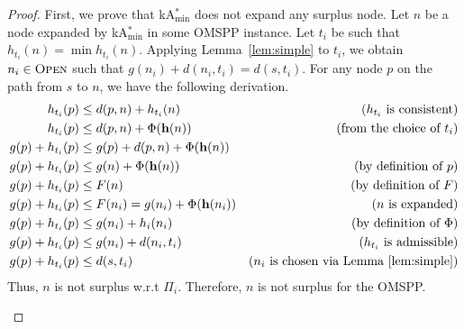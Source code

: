 \documentclass[smallextended]{svjour3}       %
\newcommand{\omspp}{\ac{OMSPP}\xspace}
\newcommand{\kastarvar}[1]{\textup{kA}$^*_{#1}$\xspace}
\newcommand{\kastarmin}{\kastarvar{\min}}
\newcommand{\open}{\textsc{Open}\xspace}
\newcommand{\vect}[1]{\mathbf{#1}}
\begin{document}
\admissiblesurplus*
\begin{proof}
First, we prove that \kastarmin does not expand any surplus node.
Let $n$ be a node expanded by \kastarmin in some \omspp instance.
Let $t_i$ be such that $h_{t_i}(n) = \min h_{t_i}(n)$.
Applying Lemma~\ref{lem:simple} to $t_i$, we obtain $n_i \in \open$ such that $g(n_i) + d(n_i, t_i) = d(s, t_i)$.
For any node $p$ on the path from $s$ to $n$, we have the following derivation.
\begin{align}
h_{t_i}(p)        & \leq d(p, n) + h_{t_i}(n)         & \text{($h_{t_i}$ is consistent)}\\
h_{t_i}(p)        & \leq d(p, n) + \Phi(\vect{h}(n))         & \text{(from the choice of $t_i$)}\\
g(p) + h_{t_i}(p) & \leq g(p) + d(p, n) + \Phi(\vect{h}(n)) & \text{}\\
g(p) + h_{t_i}(p) & \leq g(n) + \Phi(\vect{h}(n))          & \text{(by definition of $p$)}\\
g(p) + h_{t_i}(p) & \leq F(n)         & \text{(by definition of $F$)}\\
g(p) + h_{t_i}(p) & \leq F(n_i) = g(n_i) + \Phi(\vect{h}(n_i))      & \text{($n$ is expanded)}\\
g(p) + h_{t_i}(p) & \leq g(n_i) + h_i(n_i) & \text{(by definition of $\Phi$)}\\
g(p) + h_{t_i}(p) & \leq g(n_i) + d(n_i, t_i) & \text{($h_{t_i}$ is admissible)}\\
g(p) + h_{t_i}(p) & \leq d(s, t_i) & \text{($n_i$ is chosen via Lemma~\ref{lem:simple})}
\label{eq:nosurplus}
\end{align}
Thus, $n$ is not surplus w.r.t $\Pi_i$. 
Therefore, $n$ is not surplus for the \omspp.
	
	
\begin{figure}
	\centering
\end{figure}
\end{proof}
\end{document}
